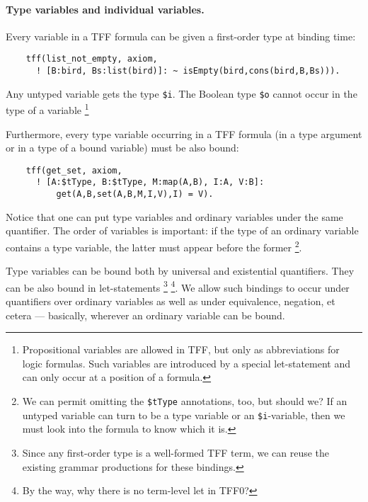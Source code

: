\paragraph{Type variables and individual variables.}
Every variable in a TFF formula can be given a first-order type
at binding time:
\begin{verbatim}
    tff(list_not_empty, axiom,
      ! [B:bird, Bs:list(bird)]: ~ isEmpty(bird,cons(bird,B,Bs))).
\end{verbatim}
Any untyped variable gets the type \verb+$i+. The Boolean type
\verb+$o+ cannot occur in the type of a variable%
\footnote{Propositional variables are allowed in TFF, but only
as abbreviations for logic formulas. Such variables are introduced
by a special let-statement and can only occur at a position of
a formula.}

Furthermore, every type variable occurring in a TFF formula
(in a type argument or in a type of a bound variable)
must be also bound:
\begin{verbatim}
    tff(get_set, axiom,
      ! [A:$tType, B:$tType, M:map(A,B), I:A, V:B]:
          get(A,B,set(A,B,M,I,V),I) = V).
\end{verbatim}
Notice that one can put type variables and ordinary variables
under the same quantifier. The order of variables is important:
if the type of an ordinary variable contains a type variable,
the latter must appear before the former%
\footnote{We can permit omitting the {\tt\$tType} annotations,
too, but should we? If an untyped variable can turn to be
a type variable or an {\tt\$i}-variable, then we must look
into the formula to know which it is.}.

Type variables can be bound both by universal and existential
quantifiers. They can be also bound in let-statements%
\footnote{Since any first-order type is a well-formed TFF term,
we can reuse the existing grammar productions for these bindings.}
\footnote{By the way, why there is no term-level let in TFF0?}.
We allow such bindings to occur under quantifiers over ordinary
variables as well as under equivalence, negation, et cetera ---
basically, wherever an ordinary variable can be bound.

